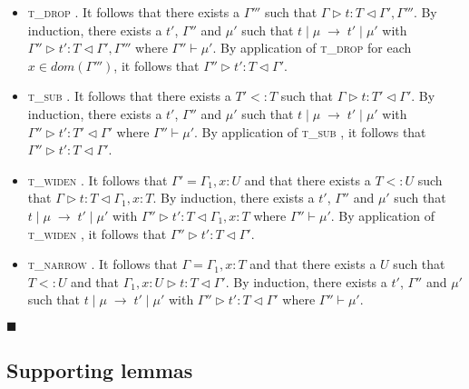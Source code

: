 \documentclass[preprint]{sigplanconf}
\newcommand{\tdrop}{\textsc{t\_drop} }
\newcommand{\tsub}{\textsc{t\_sub} }
\newcommand{\tnarrow}{\textsc{t\_narrow} }
\newcommand{\twiden}{\textsc{t\_widen} }
\newcommand{\typerule}[4]{#1 \triangleright #2 : #3 \triangleleft #4}
\newcommand{\oprule}[4]{#1 \mid #2\;\longrightarrow\;#3 \mid #4}
\newcommand{\qed}{$\blacksquare$}
\newenvironment{proof}{\vspace{1ex}\noindent{\bf Proof}\hspace{0.5em}}
  {\hfill\qed\vspace{1ex}}
\begin{document}
\begin{proof}
\begin{itemize}
\item \tdrop. It follows that there exists a $\Gamma'''$ such that
$\typerule{\Gamma}{t}{T}{\Gamma', \Gamma'''}$. By induction, there exists
a $t'$, $\Gamma''$ and $\mu'$ such that
$\oprule{t}{\mu}{t'}{\mu'}$ with
$\typerule{\Gamma''}{t'}{T}{\Gamma', \Gamma'''}$ where $\Gamma'' \vdash \mu'$.
By application of \tdrop for each $x \in dom(\Gamma''')$, it follows that
$\typerule{\Gamma''}{t'}{T}{\Gamma'}$.

\item \tsub. It follows that there exists a $T' <: T$ such that
$\typerule{\Gamma}{t}{T'}{\Gamma'}$. By induction, there exists a $t'$,
$\Gamma''$ and $\mu'$ such that 
$\oprule{t}{\mu}{t'}{\mu'}$ with
$\typerule{\Gamma''}{t'}{T'}{\Gamma'}$ where
$\Gamma'' \vdash \mu'$. By application of \tsub, it follows that
$\typerule{\Gamma''}{t'}{T}{\Gamma'}$.

\item \twiden. It follows that $\Gamma' = \Gamma_1, x : U$ and that there
exists a $T <: U$ such that $\typerule{\Gamma}{t}{T}{\Gamma_1, x : T}$.
By induction, there exists a $t'$, $\Gamma''$ and $\mu'$ such that
$\oprule{t}{\mu}{t'}{\mu'}$ with $\typerule{\Gamma''}{t'}{T}{\Gamma_1, x : T}$
where $\Gamma'' \vdash \mu'$. By application of \twiden, it follows that
$\typerule{\Gamma''}{t'}{T}{\Gamma'}$.

\item \tnarrow. It follows that $\Gamma = \Gamma_1, x : T$ and that there
exists a $U$ such that $T <: U$ and that $\typerule{\Gamma_1, x : U}{t}{T}{\Gamma'}$.
By induction, there exists a $t'$, $\Gamma''$ and $\mu'$ such that
$\oprule{t}{\mu}{t'}{\mu'}$ with $\typerule{\Gamma''}{t'}{T}{\Gamma'}$ where
$\Gamma'' \vdash \mu'$.

\end{itemize}
\end{proof}

\subsection{Supporting lemmas}
\label{app:proofs}

\end{document}
